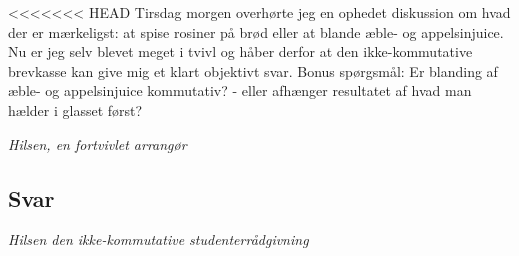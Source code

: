 \begin{minipage}[t]{100mm}
\vspace{3mm}

<<<<<<< HEAD
Tirsdag morgen overhørte jeg en ophedet diskussion om hvad der er mærkeligst: at spise rosiner på brød eller at blande æble- og appelsinjuice. Nu er jeg selv blevet meget i tvivl og håber derfor at den ikke-kommutative brevkasse kan give mig et klart objektivt svar. Bonus spørgsmål: Er blanding af æble- og appelsinjuice kommutativ? - eller afhænger resultatet af hvad man hælder i glasset først?
 
\emph{Hilsen, en fortvivlet arrangør}

\subsection*{Svar}

{\flushright\emph{Hilsen den ikke-kommutative studenterrådgivning}}





\end{minipage}

